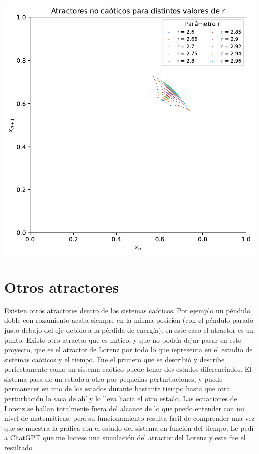 \documentclass[
  10pt,
  a4paper,
  DIV=11,
  numbers=noendperiod,
  open=any]{scrreprt}
\makeatletter
\newcommand*\pandocbounded[1]{%
  \sbox\pandoc@box{#1}%
  \Gscale@div\@tempa{\textheight}{\dimexpr\ht\pandoc@box+\dp\pandoc@box\relax}%
  \Gscale@div\@tempb{\linewidth}{\wd\pandoc@box}%
  \ifdim\@tempb\p@<\@tempa\p@\let\@tempa\@tempb\fi%
  \ifdim\@tempa\p@<\p@\scalebox{\@tempa}{\usebox\pandoc@box}%
  \else\usebox{\pandoc@box}%
  \fi%
}
\numberwithin{equation}{chapter}
\numberwithin{equation}{section}
\renewcommand{\[}{\begin{equation}}
\renewcommand{\]}{\end{equation}}
\providecommand{\pandocbounded}[1]{#1}%
\renewcommand{\pandocbounded}[1]{\begingroup\centering #1\par\endgroup}
\makeatother
\begin{document}
\pandocbounded{\includegraphics[keepaspectratio]{04-clima/atractor_files/figure-pdf/cell-8-output-1.pdf}}

\section{Otros atractores}\label{otros-atractores}

Existen otros atractores dentro de los sistemas caóticos. Por ejemplo un
péndulo doble con rozamiento acaba siempre en la misma posición (con el
péndulo parado justo debajo del eje debido a la pérdida de energía); en
este caso el atractor es un punto. Existe otro atractor que es mítico, y
que no podría dejar pasar en este proyecto, que es el atractor de Lorenz
por todo lo que representa en el estudio de sistemas caóticos y el
tiempo. Fue el primero que se describió y describe perfectamente como un
sistema caótico puede tener dos estados diferenciados. El sistema pasa
de un estado a otro por pequeñas perturbaciones, y puede permanecer en
uno de los estados durante bastante tiempo hasta que otra perturbación
lo saca de ahí y lo lleva hacia el otro estado. Las ecuaciones de Lorenz
se hallan totalmente fuera del alcance de lo que puedo entender con mi
nivel de matemáticas, pero su funcionamiento resulta fácil de comprender
una vez que se muestra la gráfica con el estado del sistema en función
del tiempo. Le pedí a ChatGPT que me hiciese una simulación del atractor
del Lorenz y este fue el resultado
\end{document}

